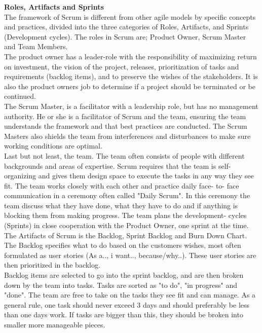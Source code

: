 \clearpage 
\textbf{\LARGE Roles, Artifacts and Sprints} \\

The framework of Scrum is different from other agile models by specific concepts and practices, divided into the three categories of Roles, Artifacts, and Sprints (Development cycles). The roles in Scrum are; Product Owner, Scrum Master and Team Members. \\

The product owner has a leader-role with the responsibility of maximizing return on investment, the vision of the project, releases, prioritization of tasks and requirements (backlog items), and to preserve the wishes of the stakeholders. It is also the product owners job to determine if a project should be terminated or be continued.\\

The Scrum Master, is a facilitator with a leadership role, but has no management authority. He or she is a facilitator of Scrum and the team, ensuring the team understands the framework and that best practices are conducted. The Scrum Masters also shields the team from interferences and disturbances to make sure working conditions are optimal.\\

Last but not least, the team. The team often consists of people with different backgrounds and areas of expertise. Scrum requires that the team is self-organizing and gives them design space to execute the tasks in any way they see fit. The team works closely with each other and practice daily face- to- face communication in a ceremony often called "Daily Scrum". In this ceremony the team discuss what they have done, what they have to do and if anything is blocking them from making progress. The team plans the development- cycles (Sprints) in close cooperation with the Product Owner, one sprint at the time. \\

The Artifacts of Scrum is the Backlog, Sprint Backlog and Burn Down Chart. The Backlog specifies what to do based on the customers wishes, most often formulated as user stories (As a.., i want.., because/why..). These user stories are then prioritized in the backlog.\\

Backlog items are selected to go into the sprint backlog, and are then broken down by the team into tasks. Tasks are sorted as "to do", "in progress" and "done". The team are free to take on the tasks they see fit and can manage. As a general rule, one task should never exceed 3 days and should preferably be less than one days work. If tasks are bigger than this, they should be broken into smaller more manageable pieces.\\

